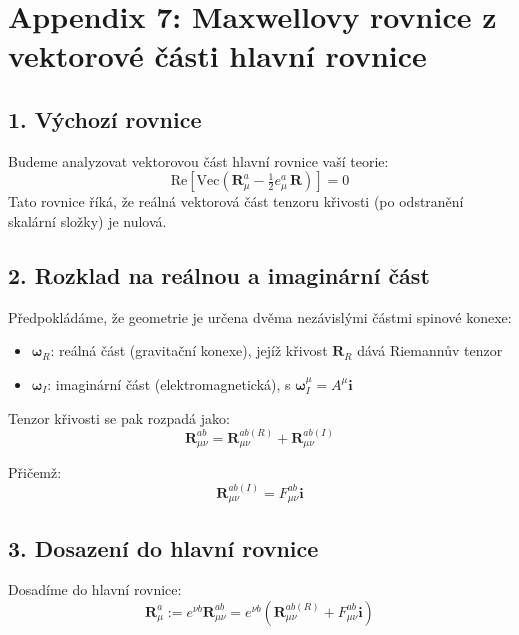 
\section*{Appendix 7: Maxwellovy rovnice z vektorové části hlavní rovnice}

\subsection*{1. Výchozí rovnice}

Budeme analyzovat vektorovou část hlavní rovnice vaší teorie:
\[
\text{Re}\left[\text{Vec}\left(\mathbf{R}^a_\mu - \tfrac{1}{2} e^a_\mu \, \mathbf{R}\right)\right] = 0
\]
Tato rovnice říká, že reálná vektorová část tenzoru křivosti (po odstranění skalární složky) je nulová.

\subsection*{2. Rozklad na reálnou a imaginární část}

Předpokládáme, že geometrie je určena dvěma nezávislými částmi spinové konexe:
\begin{itemize}
\item $\boldsymbol{\omega}_R$: reálná část (gravitační konexe), jejíž křivost $\mathbf{R}_R$ dává Riemannův tenzor
\item $\boldsymbol{\omega}_I$: imaginární část (elektromagnetická), s $\boldsymbol{\omega}_I^\mu = A^\mu \mathbf{i}$
\end{itemize}

Tenzor křivosti se pak rozpadá jako:
\[
\mathbf{R}_{\mu\nu}^{ab} = \mathbf{R}_{\mu\nu}^{ab (R)} + \mathbf{R}_{\mu\nu}^{ab (I)}
\]

Přičemž:
\[
\mathbf{R}_{\mu\nu}^{ab (I)} = F_{\mu\nu}^{ab} \mathbf{i}
\]

\subsection*{3. Dosazení do hlavní rovnice}

Dosadíme do hlavní rovnice:
\[
\mathbf{R}^a_\mu := e^{\nu b} \mathbf{R}_{\mu\nu}^{ab} = e^{\nu b} \left( \mathbf{R}_{\mu\nu}^{ab (R)} + F_{\mu\nu}^{ab} \mathbf{i} \right)
\]


